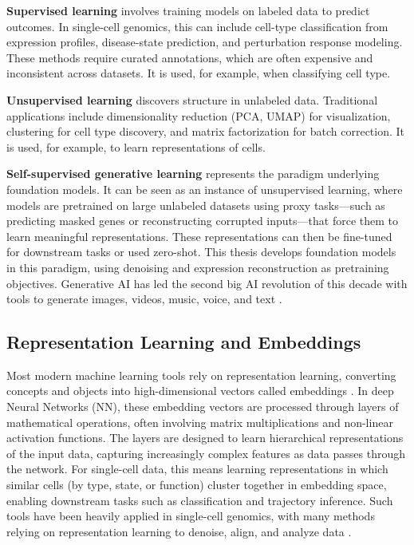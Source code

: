 \textbf{Supervised learning} involves training models on labeled data to predict outcomes. In single-cell genomics, this can include cell-type classification from expression profiles, disease-state prediction, and perturbation response modeling. These methods require curated annotations, which are often expensive and inconsistent across datasets. It is used, for example, when classifying cell type.

\textbf{Unsupervised learning} discovers structure in unlabeled data. Traditional applications include dimensionality reduction (PCA, UMAP) for visualization, clustering for cell type discovery, and matrix factorization for batch correction. It is used, for example, to learn representations of cells.

\textbf{Self-supervised generative learning} represents the paradigm underlying foundation models. It can be seen as an instance of unsupervised learning, where models are pretrained on large unlabeled datasets using proxy tasks---such as predicting masked genes or reconstructing corrupted inputs---that force them to learn meaningful representations. These representations can then be fine-tuned for downstream tasks or used zero-shot. This thesis develops foundation models in this paradigm, using denoising and expression reconstruction as pretraining objectives. Generative AI has led the second big AI revolution of this decade with tools to generate images, videos, music, voice, and text \cite{rombachHighResolutionImageSynthesis2022, shenNaturalSpeech2Latent2023, singerMakeAVideoTexttoVideoGeneration2022}.

\subsection{Representation Learning and Embeddings}
Most modern machine learning tools rely on representation learning, converting concepts and objects into high-dimensional vectors called embeddings \cite{Goodfellow-et-al-2016}. In deep Neural Networks (\gls{NN}), these embedding vectors are processed through layers of mathematical operations, often involving matrix multiplications and non-linear activation functions. The layers are designed to learn hierarchical representations of the input data, capturing increasingly complex features as data passes through the network. For single-cell data, this means learning representations in which similar cells (by type, state, or function) cluster together in embedding space, enabling downstream tasks such as classification and trajectory inference. Such tools have been heavily applied in single-cell genomics, with many methods relying on representation learning to denoise, align, and analyze data \cite{scvi}.

